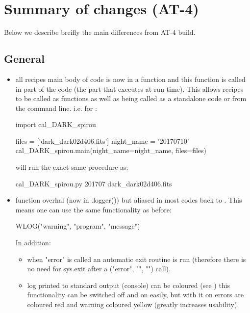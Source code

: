 \chapter{Summary of changes (AT-4)}
\label{ch:changelog}

Below we describe breifly the main differences from AT-4 build.

\section{General}
\begin{itemize}

\item all recipes main body of code is now in a  function and this function is called in  part of the code (the part that executes at run time). This allows recipes to be called as functions as well as being called as a standalone code or from the command line. i.e. for \calDARK:
	\begin{pythonbox}
	import cal_DARK_spirou
	    
	files = ['dark_dark02d406.fits']
	night_name = '20170710'
	cal_DARK_spirou.main(night_name=night_name, files=files)
	\end{pythonbox}
	will run the exact same procedure as:
	\begin{bashbox}
	cal_DARK_spirou.py 201707 dark_dark02d406.fits
	\end{bashbox}

\item \WLOG function overhal (now in \spirouLog.logger()) but aliased in most codes back to \WLOG. This means one can use the same functionality as before:
	\begin{pythonbox}
	WLOG("warning", "program", "message")
	\end{pythonbox}
	In addition:
	\begin{itemize}
	\item when "error" is called an automatic exit routine is run (therefore there is no need for sys.exit after a \WLOG("error", "", "") call).

	\item log printed to standard output (console) can be coloured (see ) this functionality can be switched off and on easily, but with it on errors are coloured red and warning coloured yellow (greatly increases usability).


\end{itemize}
\end{itemize}
